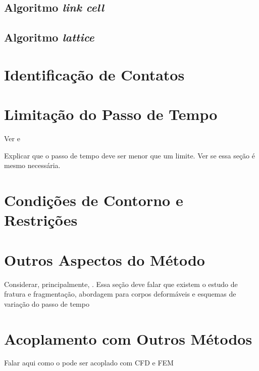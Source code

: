 \subsection{Algoritmo \textit{link cell}}
\subsection{Algoritmo \textit{lattice}}

\section{Identificação de Contatos}

\section{Limitação do Passo de Tempo}

\alert{Ver  e }

\alert{Explicar que o passo de tempo deve ser menor que um limite. Ver se essa seção é mesmo necessária.}

\section{Condições de Contorno e Restrições} \label{sec:boundary_condition}

\section{Outros Aspectos do Método}
\alert{Considerar, principalmente, . Essa seção deve falar que existem o estudo de fratura e fragmentação, abordagem para corpos deformáveis e esquemas de variação do passo de tempo}

\section{Acoplamento com Outros Métodos}
\alert{Falar aqui como o \DEM{} pode ser acoplado com CFD e FEM}